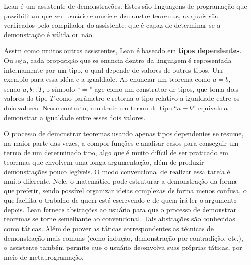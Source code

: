 \documentclass[12pt, oneside, a4paper,english,brazil]{abntex2}
\begin{document}
\qquad Lean\cite{2} \'e um assistente de demonstra\c{c}\~oes. Estes s\~ao linguagens de programa\c{c}\~ao que
possibilitam que seu usu\'ario enuncie e demonstre teoremas, os quais s\~ao verificados pelo compilador do
assistente, que \'e capaz de determinar se a demonstra\c{c}\~ao \'e v\'alida ou n\~ao.

\qquad Assim como muitos outros assistentes, Lean \'e baseado em \textbf{tipos
  dependentes}\cite{typesAtWork}. Ou seja, cada proposi\c{c}\~ao que se enuncia dentro da linguagem \'e
representada internamente por um tipo, o qual depende de valores de outros tipos. Um exemplo para essa
id\'eia \'e a igualdade. Ao enunciar um teorema como $a = b$, sendo $a, b :: T$, o s\'imbolo ``$=$'' age como
um construtor de tipos, que toma dois valores do tipo $T$ como par\^ametro e retorna o tipo relativo a
igualdade entre os dois valores. Nesse contexto, construir um termo do tipo ``$a = b$'' equivale a demonstrar
a igualdade entre esses dois valores.

\qquad O processo de demonstrar teoremas usando apenas tipos dependentes se resume, na maior parte das vezes, a
compor fun\c{c}\~oes e analisar casos para conseguir um termo de um determinado tipo, algo que \'e muito dif\'icil
de ser praticado em teoremas que envolvem uma longa argumenta\c{c}\~ao, al\'em de produzir demonstra\c{c}\~oes
pouco leg\'iveis. O modo convencional de realizar essa tarefa \'e muito diferente. Nele,
o matem\'atico pode estruturar a demonstra\c{c}\~ao da forma que preferir, sendo poss\'ivel organizar
ideias complexas de forma menos confusa, o que facilita o trabalho de quem est\'a escrevendo e de quem ir\'a
ler o argumento depois.
Lean fornece abstra\c{c}\~oes ao usu\'ario para que o processo de demonstrar teoremas se torne semelhante ao
convencional. Tais abstra\c{c}\~oes s\~ao conhecidas como t\'aticas. Al\'em de prover as t\'aticas
correspondentes as t\'ecnicas de demonstra\c{c}\~ao mais comuns (como indu\c{c}\~ao, demonstra\c{c}\~ao por
contradi\c{c}\~ao, etc.), o assistente tamb\'em permite que o usu\'ario desenvolva suas pr\'oprias t\'aticas, por
meio de metaprograma\c{c}\~ao\cite{metaprog}.
\end{document}

